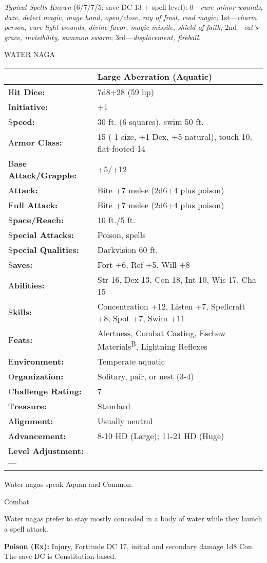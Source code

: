 \documentclass{article}
\begin{document}
\textit{Typical Spells Known }(6/7/7/5; save DC 13 + spell level): 0---\textit{cure 
minor wounds, daze, detect magic, mage hand, open/close, ray of frost, read magic; 
}1st---\textit{charm person, cure light wounds, divine favor, magic missile, shield 
of faith; }2nd---\textit{cat's grace, invisibility, summon swarm}; 3rd---\textit{displacement, 
fireball.}

\vspace{12pt}
WATER NAGA

\begin{tabular}{|>{\raggedright}p{83pt}|>{\raggedright}p{242pt}|}
\hline
  & Large Aberration (Aquatic)\tabularnewline
\hline
H\textbf{it Dice:} & 7d8+28 (59 hp)\tabularnewline
\hline
I\textbf{nitiative:} & +1\tabularnewline
\hline
S\textbf{peed:} & 30 ft. (6 squares), swim 50 ft.\tabularnewline
\hline
A\textbf{rmor Class:} & 15 (-1 size, +1 Dex, +5 natural), touch 10, flat-footed 
14\tabularnewline
\hline
B\textbf{ase Attack/Grapple:} & +5/+12\tabularnewline
\hline
A\textbf{ttack:} & Bite +7 melee (2d6+4 plus poison)\tabularnewline
\hline
F\textbf{ull Attack:} & Bite +7 melee (2d6+4 plus poison)\tabularnewline
\hline
S\textbf{pace/Reach:} & 10 ft./5 ft.\tabularnewline
\hline
S\textbf{pecial Attacks:} & Poison, spells\tabularnewline
\hline
S\textbf{pecial Qualities:} & Darkvision 60 ft.\tabularnewline
\hline
S\textbf{aves:} & Fort +6, Ref +5, Will +8\tabularnewline
\hline
A\textbf{bilities:} & Str 16, Dex 13, Con 18, Int 10, Wis 17, Cha 15\tabularnewline
\hline
S\textbf{kills:} & Concentration +12, Listen +7, Spellcraft +8, Spot +7, Swim +11\tabularnewline
\hline
F\textbf{eats:} & Alertness, Combat Casting, Eschew Materials\textsuperscript{B}, 
Lightning Reflexes\tabularnewline
\hline
E\textbf{nvironment:} & Temperate aquatic\tabularnewline
\hline
O\textbf{rganization:} & Solitary, pair, or nest (3-4)\tabularnewline
\hline
C\textbf{hallenge Rating:} & 7\tabularnewline
\hline
T\textbf{reasure:} & Standard\tabularnewline
\hline
A\textbf{lignment:} & Usually neutral\tabularnewline
\hline
A\textbf{dvancement:} & 8-10 HD (Large); 11-21 HD (Huge)\tabularnewline
\hline
L\textbf{evel Adjustment:}--- & \tabularnewline
\hline
\end{tabular}

Water nagas speak Aquan and Common.

Combat

Water nagas prefer to stay mostly concealed in a body of water while they launch 
a spell attack.

\textbf{Poison (Ex): }Injury, Fortitude DC 17, initial and secondary damage 1d8 
Con. The save DC is Constitution-based.
\end{document}
